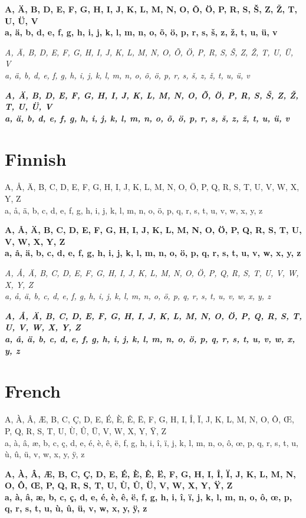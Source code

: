 \documentclass[12pt]{article}
\begin{document}
\textbf{
A, Ä, B, D, E, F, G, H, I, J, K, L, M, N, O, Õ, Ö, P, R, S, Š, Z, Ž, T, U, Ü, V \\
a, ä, b, d, e, f, g, h, i, j, k, l, m, n, o, õ, ö, p, r, s, š, z, ž, t, u, ü, v
}

\textit{
A, Ä, B, D, E, F, G, H, I, J, K, L, M, N, O, Õ, Ö, P, R, S, Š, Z, Ž, T, U, Ü, V \\
a, ä, b, d, e, f, g, h, i, j, k, l, m, n, o, õ, ö, p, r, s, š, z, ž, t, u, ü, v
}

\textbf{\textit{
A, Ä, B, D, E, F, G, H, I, J, K, L, M, N, O, Õ, Ö, P, R, S, Š, Z, Ž, T, U, Ü, V \\
a, ä, b, d, e, f, g, h, i, j, k, l, m, n, o, õ, ö, p, r, s, š, z, ž, t, u, ü, v
}}


\section{Finnish}
A, Å, Ä, B, C, D, E, F, G, H, I, J, K, L, M, N, O, Ö, P, Q, R, S, T, U, V, W, X, Y, Z \\
a, å, ä, b, c, d, e, f, g, h, i, j, k, l, m, n, o, ö, p, q, r, s, t, u, v, w, x, y, z

\textbf{
A, Å, Ä, B, C, D, E, F, G, H, I, J, K, L, M, N, O, Ö, P, Q, R, S, T, U, V, W, X, Y, Z \\
a, å, ä, b, c, d, e, f, g, h, i, j, k, l, m, n, o, ö, p, q, r, s, t, u, v, w, x, y, z
}

\textit{
A, Å, Ä, B, C, D, E, F, G, H, I, J, K, L, M, N, O, Ö, P, Q, R, S, T, U, V, W, X, Y, Z \\
a, å, ä, b, c, d, e, f, g, h, i, j, k, l, m, n, o, ö, p, q, r, s, t, u, v, w, x, y, z
}

\textbf{\textit{
A, Å, Ä, B, C, D, E, F, G, H, I, J, K, L, M, N, O, Ö, P, Q, R, S, T, U, V, W, X, Y, Z \\
a, å, ä, b, c, d, e, f, g, h, i, j, k, l, m, n, o, ö, p, q, r, s, t, u, v, w, x, y, z
}}


\clearpage
\section{French}
A, À, Â, Æ, B, C, Ç, D, E, É, È, Ê, Ë, F, G, H, I, Î, Ï, J, K, L, M, N, O, Ô, Œ, P, Q, R, S, T, U, Ù, Û, Ü, V, W, X, Y, Ÿ, Z \\
a, à, â, æ, b, c, ç, d, e, é, è, ê, ë, f, g, h, i, î, ï, j, k, l, m, n, o, ô, œ, p, q, r, s, t, u, ù, û, ü, v, w, x, y, ÿ, z

\textbf{
A, À, Â, Æ, B, C, Ç, D, E, É, È, Ê, Ë, F, G, H, I, Î, Ï, J, K, L, M, N, O, Ô, Œ, P, Q, R, S, T, U, Ù, Û, Ü, V, W, X, Y, Ÿ, Z \\
a, à, â, æ, b, c, ç, d, e, é, è, ê, ë, f, g, h, i, î, ï, j, k, l, m, n, o, ô, œ, p, q, r, s, t, u, ù, û, ü, v, w, x, y, ÿ, z
}
\end{document}
